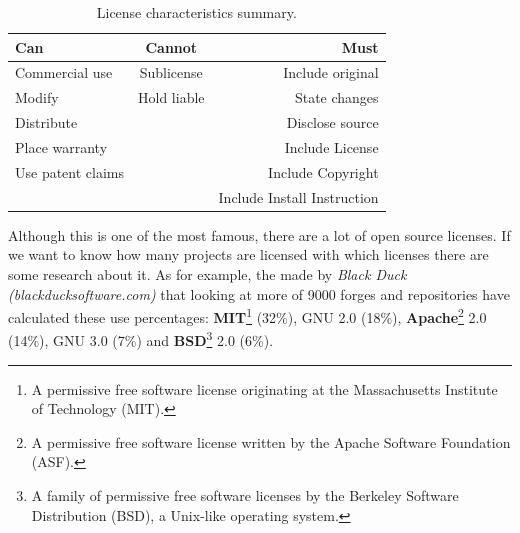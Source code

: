 \begin{table}[H]
  \centering
  \begin{tabular}{ l | c | r }
    Can &  Cannot & Must \\
    \hline
    Commercial use    & Sublicense    &  Include original \\
    Modify            & Hold liable   &  State changes \\
    Distribute        &               &  Disclose source \\
    Place warranty    &               &  Include License \\
    Use patent claims &               &  Include Copyright \\
                      &               &  Include Install Instruction \\
  \end{tabular}
  \caption{License characteristics summary.}
\end{table}

\noindent Although this is one of the most famous, there are a lot of open source
licenses. If we want to know how many projects are licensed with which licenses
there are some research about it. As for example, the made by \textit{Black Duck
(blackducksoftware.com)} that looking at more of 9000 forges and repositories have
calculated these use percentages:  \textbf{MIT}\footnote{A permissive free software
license originating at the Massachusetts Institute of Technology (MIT).} (32\%), GNU 2.0 (18\%),
\textbf{Apache}\footnote{A permissive free software license written by the Apache
Software Foundation (ASF).} 2.0 (14\%), GNU 3.0	(7\%) and \textbf{BSD}\footnote{A
family of permissive free software licenses by the Berkeley Software Distribution (BSD),
a Unix-like operating system.} 2.0 (6\%).

